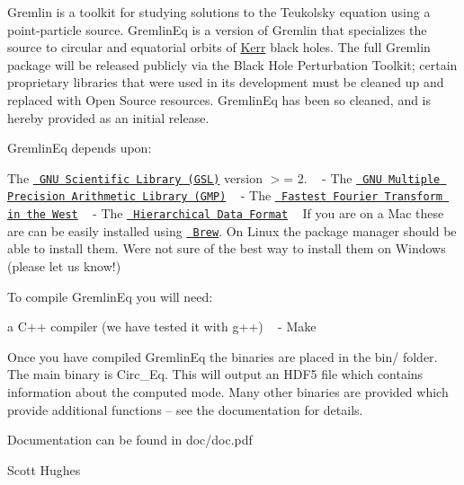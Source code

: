 Gremlin is a toolkit for studying solutions to the Teukolsky equation using a point-\/particle source. Gremlin\+Eq is a version of Gremlin that specializes the source to circular and equatorial orbits of \mbox{\hyperlink{class_kerr}{Kerr}} black holes. The full Gremlin package will be released publicly via the Black Hole Perturbation Toolkit; certain proprietary libraries that were used in its development must be cleaned up and replaced with Open Source resources. Gremlin\+Eq has been so cleaned, and is hereby provided as an initial release.

Gremlin\+Eq depends upon\+: ~\newline

\begin{DoxyItemize}
\item The \href{https://www.gnu.org/software/gsl/}{\texttt{ G\+NU Scientific Library (G\+SL)}} version $>$= 2. ~\newline
-\/ The \href{https://gmplib.org/}{\texttt{ G\+NU Multiple Precision Arithmetic Library (G\+MP)}} ~\newline
-\/ The \href{http://www.fftw.org/}{\texttt{ Fastest Fourier Transform in the West}} ~\newline
-\/ The \href{https://www.hdfgroup.org/solutions/hdf5/}{\texttt{ Hierarchical Data Format}} ~\newline
 If you are on a Mac these are can be easily installed using \href{https://brew.sh/}{\texttt{ Brew}}. On Linux the package manager should be able to install them. We\textquotesingle{}re not sure of the best way to install them on Windows (please let us know!)
\end{DoxyItemize}

To compile Gremlin\+Eq you will need\+: ~\newline

\begin{DoxyItemize}
\item a C++ compiler (we have tested it with g++) ~\newline
-\/ Make
\end{DoxyItemize}

Once you have compiled Gremlin\+Eq the binaries are placed in the bin/ folder. The main binary is \textquotesingle{}Circ\+\_\+\+Eq\textquotesingle{}. This will output an H\+D\+F5 file which contains information about the computed mode. Many other binaries are provided which provide additional functions -- see the documentation for details.

Documentation can be found in doc/doc.\+pdf

Scott Hughes 